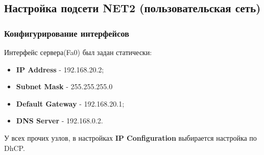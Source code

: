\documentclass[14pt,a4paper,report]{report}
\begin{document}
\subsection{Настройка подсети NET2 (пользовательская сеть)}
\subsubsection{Конфигурирование интерфейсов}
Интерфейс сервера(Fa0) был задан статически:
\begin{itemize}
\item \textbf{IP Address} - 192.168.20.2;
\item \textbf{Subnet Mask} - 255.255.255.0
\item \textbf{Default Gateway} - 192.168.20.1;
\item \textbf{DNS Server} - 192.168.0.2.
\end{itemize}
У всех прочих узлов, в настройках \textbf{IP Configuration} выбирается настройка по DhCP.
\end{document}

